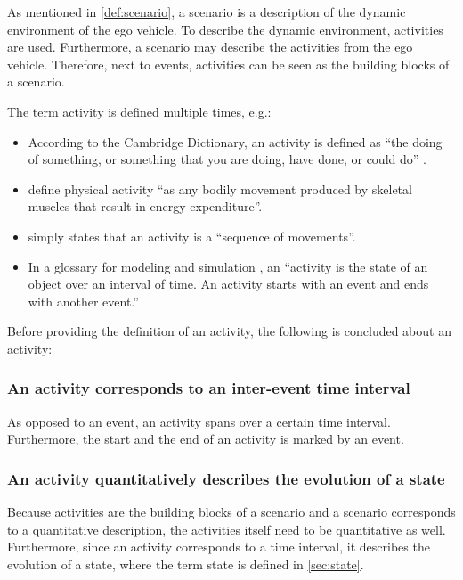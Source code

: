 \cbstart
As mentioned in \cref{def:scenario}, a scenario is a description of the dynamic environment of the ego vehicle. To describe the dynamic environment, activities are used. Furthermore, a scenario may describe the activities from the ego vehicle. Therefore, next to events, activities can be seen as the building blocks of a scenario.

The term activity is defined multiple times, e.g.:
\begin{itemize}
	\item According to the Cambridge Dictionary, an activity is defined as ``the doing of something, or something that you are doing, have done, or could do'' \cite{cambridge2019activity}.
	\item \textcite{caspersen1985physical} define physical activity ``as any bodily movement produced by skeletal muscles that result in energy expenditure''.
	\item \textcite{bobick1997movement} simply states that an activity is a ``sequence of movements''. 
	\item In a glossary for modeling and simulation \cite{sigsim2019glossary}, an ``activity is the state of an object over an interval of time. An activity starts with an event and ends with another event.''
\end{itemize}

Before providing the definition of an activity, the following is concluded about an activity:

\subsubsection{An activity corresponds to an inter-event time interval}
As opposed to an event, an activity spans over a certain time interval. Furthermore, the start and the end of an activity is marked by an event.

\subsubsection{An activity quantitatively describes the evolution of a state}
Because activities are the building blocks of a scenario and a scenario corresponds to a quantitative description, the activities itself need to be quantitative as well. Furthermore, since an activity corresponds to a time interval, it describes the evolution of a state, where the term state is defined in \cref{sec:state}.

